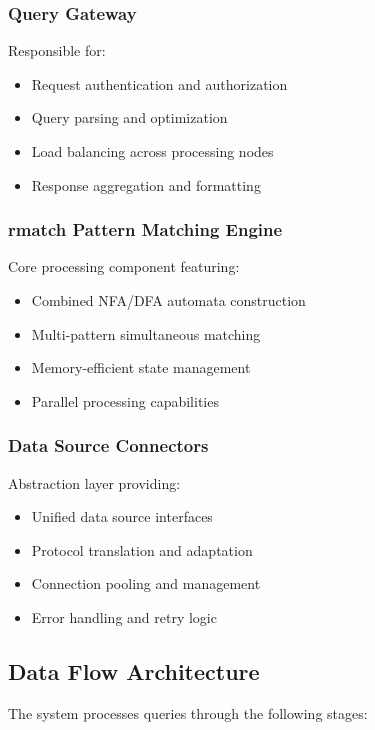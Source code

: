 \documentclass[11pt,a4paper]{article}
\begin{document}
\subsubsection{Query Gateway}
Responsible for:
\begin{itemize}
\item Request authentication and authorization
\item Query parsing and optimization
\item Load balancing across processing nodes
\item Response aggregation and formatting
\end{itemize}

\subsubsection{rmatch Pattern Matching Engine}
Core processing component featuring:
\begin{itemize}
\item Combined NFA/DFA automata construction
\item Multi-pattern simultaneous matching
\item Memory-efficient state management
\item Parallel processing capabilities
\end{itemize}

\subsubsection{Data Source Connectors}
Abstraction layer providing:
\begin{itemize}
\item Unified data source interfaces
\item Protocol translation and adaptation
\item Connection pooling and management
\item Error handling and retry logic
\end{itemize}

\subsection{Data Flow Architecture}

The system processes queries through the following stages:
\end{document}
